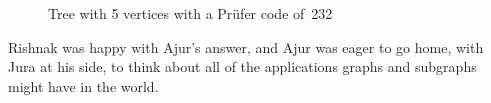 \begin{figure}
\begin{center}


\caption{Tree with 5 vertices with a Pr\"ufer code of~232}\label{6q1}
\end{center}
\end{figure}

Rishnak was happy with Ajur's answer, and Ajur was eager to go home, with Jura at his side, to think about all of the applications graphs and subgraphs might have in the world.
